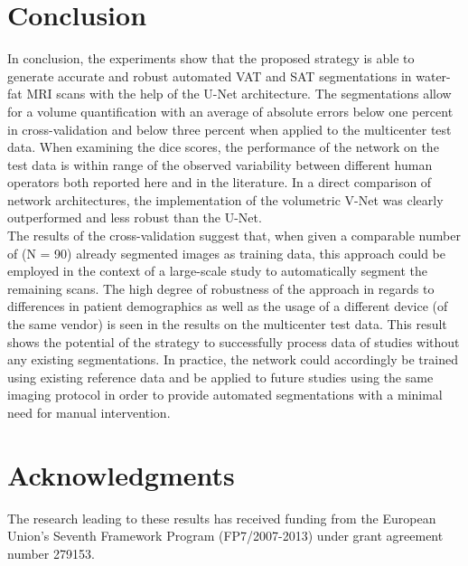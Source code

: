 \documentclass[10pt,letterpaper]{article}
\begin{document}
	
	\section*{Conclusion}
	
	In conclusion, the experiments show that the proposed strategy is able to generate accurate and robust automated VAT and SAT segmentations in water-fat MRI scans with the help of the U-Net architecture. The segmentations allow for a volume quantification with an average of absolute errors below one percent in cross-validation and below three percent when applied to the multicenter test data. When examining the dice scores, the performance of the network on the test data is within range of the observed variability between different human operators both reported here and in the literature. In a direct comparison of network architectures, the implementation of the volumetric V-Net was clearly outperformed and less robust than the U-Net. \\	
	The results of the cross-validation suggest that, when given a comparable number of (N = 90) already segmented images as training data, this approach could be employed in the context of a large-scale study to automatically segment the remaining scans. The high degree of robustness of the approach in regards to differences in patient demographics as well as the usage of a different device (of the same vendor) is seen in the results on the multicenter test data. This result shows the potential of the strategy to successfully process data of studies without any existing segmentations. In practice, the network could accordingly be trained using existing reference data and be applied to future studies using the same imaging protocol in order to provide automated segmentations with a minimal need for manual intervention.
	
	
	\section*{Acknowledgments}
	
	The research leading to these results has received funding from the European Union's Seventh Framework Program (FP7/2007-2013) under grant agreement number 279153.
	
	
	
	
	
	
	
	
	\pagebreak
	
\end{document}
